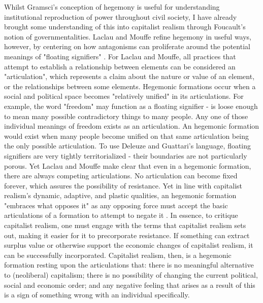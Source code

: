 Whilst Gramsci's conception of hegemony is useful for understanding institutional reproduction of power throughout civil society, I have already brought some understanding of this into capitalist realism through Foucault's notion of governmentalities. Laclau and Mouffe refine hegemony in useful ways, however, by centering on how antagonisms can proliferate around the potential meanings of "floating signifiers" \citep{laclau_hegemony_2001}. For Laclau and Mouffe, all practices that attempt to establish a relationship between elements can be considered an "articulation", which represents a claim about the nature or value of an element, or the relationships between some elements. Hegemonic formations occur when a social and political space becomes "relatively unified" \citep[136]{laclau_hegemony_2001} in its articulations. For example, the word "freedom" may function as a floating signifier - is loose enough to mean many possible contradictory things to many people. Any one of those individual meanings of freedom exists as an articulation. An hegemonic formation would exist when many people become unified on that same articulation being the only possible articulation. To use Deleuze and Guattari's language, floating signifiers are very tightly territorialized - their boundaries are not particularly porous. Yet Laclau and Mouffe make clear that even in a hegemonic formation, there are always competing articulations. No articulation can become fixed forever, which assures  the possibility of resistance. Yet in line with capitalist realism's dynamic, adaptive, and plastic qualities, an hegemonic formation "embraces what opposes it" as any opposing force must accept the basic articulations of a formation to attempt to negate it \citep[139]{laclau_hegemony_2001}. In essence, to critique capitalist realism, one must engage with the terms that capitalist realism sets out, making it easier for it to precorporate resistance.  If something can extract surplus value or otherwise support the economic changes of capitalist realism, it can be successfully incorporated. Capitalist realism, then, is a hegemonic formation resting upon the articulations that: there is no meaningful alternative to (neoliberal) capitalism; there is no possibility of changing the current political, social and economic order; and any negative feeling that arises as a result of this is a sign of something wrong with an individual specifically.

